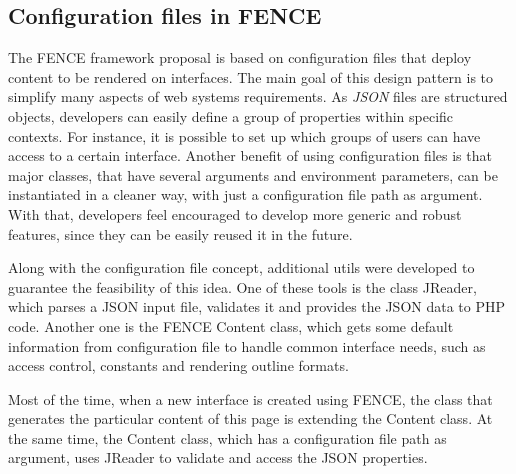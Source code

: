 \subsection{Configuration files in FENCE}
\label{sec:Configuration_files_in_FENCE}

The FENCE framework proposal is based on configuration files that deploy content to be rendered on interfaces. The main goal of this design pattern is to simplify many aspects of web systems requirements. As\textit{ JSON} files are structured objects, developers can easily define a group of properties within specific contexts. For instance, it is possible to set up which groups of users can have access to a certain interface.
Another benefit of using configuration files is that major classes, that have several arguments and environment parameters, can be instantiated in a cleaner way, with just a configuration file path as argument. With that, developers feel encouraged to develop more generic and robust features, since they can be easily reused it in the future.

Along with the configuration file concept, additional utils were developed to guarantee the feasibility of this idea. One of these tools is the class JReader, which parses a JSON input file, validates it and provides the JSON data to PHP code. Another one is the FENCE Content class, which gets some default information from configuration file to handle common interface needs, such as access control, constants and rendering outline formats.

Most of the time, when a new interface is created using FENCE, the class that generates the particular content of this page is extending the Content class. At the same time, the Content class, which has a configuration file path as argument, uses JReader to validate and access the JSON properties.
